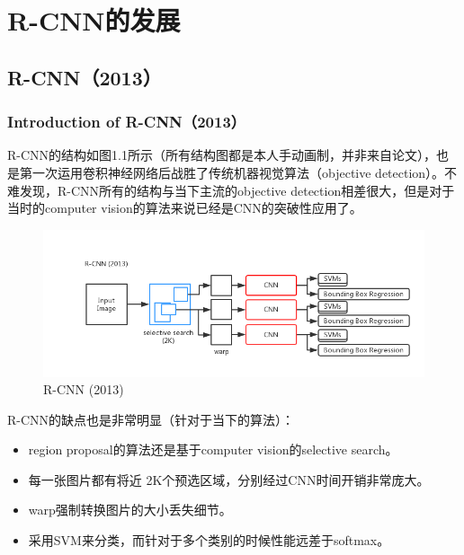 \documentclass[a4paper,12pt]{report}
\begin{document}
%  
\chapter{R-CNN的发展}
\setcounter{page}{1}
\begin{spacing}{1.5}
\songti{}

\section{R-CNN（2013）}

\subsection{Introduction of R-CNN（2013）}

R-CNN的结构如图1.1所示（所有结构图都是本人手动画制，并非来自论文），也是第一次运用卷积神经网络后战胜了传统机器视觉算法（objective detection）。不难发现，R-CNN所有的结构与当下主流的objective detection相差很大，但是对于当时的computer vision的算法来说已经是CNN的突破性应用了。

\begin{figure}[!h]
	\begin{center}
		\includegraphics[width=0.9\linewidth]{figure//RCNN.png}
		\caption{R-CNN (2013) }
		\label{Fig:1}
	\end{center}
\end{figure}

R-CNN的缺点也是非常明显（针对于当下的算法）：

\begin{itemize}
    \item region proposal的算法还是基于computer vision的selective search。
	\item 每一张图片都有将近 2K个预选区域，分别经过CNN时间开销非常庞大。
	\item warp强制转换图片的大小丢失细节。
	\item 采用SVM来分类，而针对于多个类别的时候性能远差于softmax。
\end{itemize}


\end{spacing}
\end{document}
